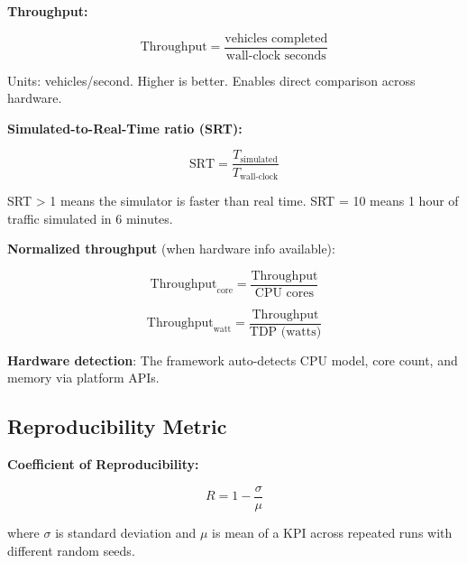 \begin{Shaded}
\begin{Highlighting}[]
     \NormalTok{(}\NormalTok{):}
        \OperatorTok{=}
         
     \NormalTok{(}\NormalTok{, }\OperatorTok{*}
        \OperatorTok{=}\OperatorTok{{-}} 
\end{Highlighting}
\end{Shaded}

\textbf{Throughput:}

\[\text{Throughput} = \frac{\text{vehicles completed}}{\text{wall-clock seconds}}\]

Units: vehicles/second. Higher is better. Enables direct comparison
across hardware.

\textbf{Simulated-to-Real-Time ratio (SRT):}

\[\text{SRT} = \frac{T_\text{simulated}}{T_\text{wall-clock}}\]

SRT \textgreater{} 1 means the simulator is faster than real time. SRT =
10 means 1 hour of traffic simulated in 6 minutes.

\textbf{Normalized throughput} (when hardware info available):

\[\text{Throughput}_\text{core} = \frac{\text{Throughput}}{\text{CPU cores}}\]

\[\text{Throughput}_\text{watt} = \frac{\text{Throughput}}{\text{TDP (watts)}}\]

\textbf{Hardware detection}: The framework auto-detects CPU model, core
count, and memory via platform APIs.

\subsection{Reproducibility
Metric}\label{364-reproducibility-metric}

\textbf{Coefficient of Reproducibility:}

\[R = 1 - \frac{\sigma}{\mu}\]

where \(\sigma\) is standard deviation and \(\mu\) is mean of a KPI
across repeated runs with different random seeds.


